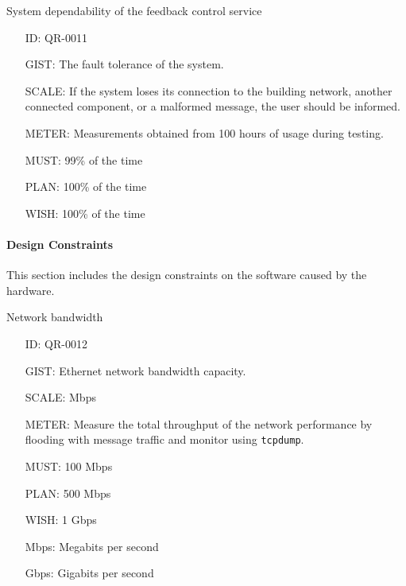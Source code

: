         System dependability of the feedback control service

        \begin{itemize}
          \setlength{\itemindent}{.5in}
          \itemsep .15em
          \item[ID:] QR-0011
          \item[GIST:] The fault tolerance of the system.
          \item[SCALE:] If the system loses its connection to the building
            network, another connected component, or a malformed message, the
            user should be informed.
          \item[METER:] Measurements obtained from 100 hours of usage during
            testing.
          \item[MUST:] 99\% of the time
          \item[PLAN:] 100\% of the time
          \item[WISH:] 100\% of the time
        \end{itemize}

      \paragraph{Design Constraints}

        This section includes the design constraints on the software caused by
        the hardware.

        Network bandwidth

        \begin{itemize}
          \setlength{\itemindent}{.5in}
          \itemsep .15em
          \item[ID:] QR-0012
          \item[GIST:] Ethernet network bandwidth capacity.
          \item[SCALE:] Mbps
          \item[METER:] Measure the total throughput of the network performance
            by flooding with message traffic and monitor using \texttt{tcpdump}.
          \item[MUST:] 100 Mbps
          \item[PLAN:] 500 Mbps
          \item[WISH:] 1 Gbps
          \item[Mbps:] Megabits per second
          \item[Gbps:] Gigabits per second
        \end{itemize}

